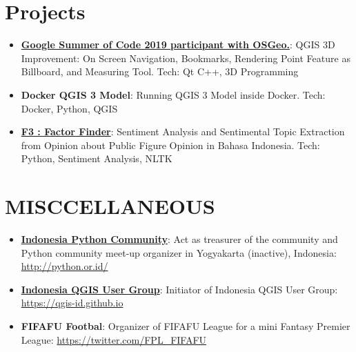\documentclass[letterpaper,11pt]{article}
\newcommand{\resumeItem}[2]{
  \item\small{
    \textbf{#1}{: #2 \vspace{-2pt}}
  }
}
\newcommand{\resumeSubItem}[2]{\resumeItem{#1}{#2}\vspace{-4pt}}
\newcommand{\resumeSubHeadingListStart}{\begin{itemize}[leftmargin=*]}
\newcommand{\resumeSubHeadingListEnd}{\end{itemize}}
\begin{document}
\section{Projects}
  \resumeSubHeadingListStart
    \resumeSubItem{\href{https://ismailsunni.github.io/GSoC-2019/}{Google Summer of Code 2019 participant with OSGeo.}}
      {QGIS 3D Improvement: On Screen Navigation, Bookmarks, Rendering Point Feature as Billboard, and Measuring Tool. Tech: Qt C++, 3D Programming}
    \resumeSubItem{Docker QGIS 3 Model}
      {Running QGIS 3 Model inside Docker. Tech: Docker, Python, QGIS}
    \resumeSubItem{\href{https://github.com/ismailsunni/f3-factor-finder}{F3 : Factor Finder}}
      {Sentiment Analysis and Sentimental Topic Extraction from Opinion about Public Figure Opinion in Bahasa Indonesia. Tech: Python, Sentiment Analysis, NLTK}
  \resumeSubHeadingListEnd

\section{MISCCELLANEOUS}
  \resumeSubHeadingListStart
    \resumeSubItem{\href{http://python.or.id/}{Indonesia Python Community}}
      {Act as treasurer of the community and Python community meet-up organizer in Yogyakarta (inactive), Indonesia: \url{http://python.or.id/}}
    \resumeSubItem{\href{https://qgis-id.github.io}{Indonesia QGIS User Group}}
      {Initiator of Indonesia QGIS User Group: \url{https://qgis-id.github.io}}
    \resumeSubItem{FIFAFU Footbal}
      {Organizer of FIFAFU League for a mini Fantasy Premier League: \url{https://twitter.com/FPL_FIFAFU}}
  \resumeSubHeadingListEnd




\end{document}
